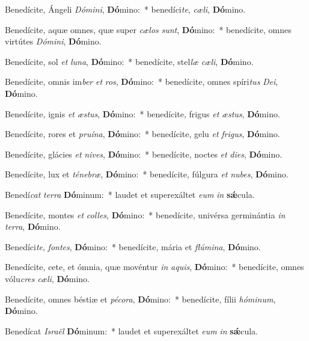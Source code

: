 \item Benedícite, Ángeli \textit{Dó}\textit{mi}\textit{ni}, \textbf{Dó}mino:~* benedíci\textit{te}, \textit{cæ}\textit{li}, \textbf{Dó}mino.
\item Benedícite, aquæ omnes, quæ super \textit{cæ}\textit{los} \textit{sunt}, \textbf{Dó}mino:~* benedícite, omnes virtútes \textit{Dó}\textit{mi}\textit{ni}, \textbf{Dó}mino.
\item Benedícite, sol \textit{et} \textit{lu}\textit{na}, \textbf{Dó}mino:~* benedícite, stel\textit{læ} \textit{cæ}\textit{li}, \textbf{Dó}mino.
\item Benedícite, omnis im\textit{ber} \textit{et} \textit{ros}, \textbf{Dó}mino:~* benedícite, omnes spíri\textit{tus} \textit{De}\textit{i}, \textbf{Dó}mino.
\item Benedícite, ignis \textit{et} \textit{æs}\textit{tus}, \textbf{Dó}mino:~* benedícite, frigus \textit{et} \textit{æs}\textit{tus}, \textbf{Dó}mino.
\item Benedícite, rores et \textit{pru}\textit{í}\textit{na}, \textbf{Dó}mino:~* benedícite, gelu \textit{et} \textit{fri}\textit{gus}, \textbf{Dó}mino.
\item Benedícite, glácies \textit{et} \textit{ni}\textit{ves}, \textbf{Dó}mino:~* benedícite, noctes \textit{et} \textit{di}\textit{es}, \textbf{Dó}mino.
\item Benedícite, lux et \textit{té}\textit{ne}\textit{bræ}, \textbf{Dó}mino:~* benedícite, fúlgura \textit{et} \textit{nu}\textit{bes}, \textbf{Dó}mino.
\item Benedí\textit{cat} \textit{ter}\textit{ra} \textbf{Dó}minum:~* laudet et superexáltet \textit{e}\textit{um} \textit{in} \textbf{sǽ}cula.
\item Benedícite, montes \textit{et} \textit{col}\textit{les}, \textbf{Dó}mino:~* benedícite, univérsa germinántia \textit{in} \textit{ter}\textit{ra}, \textbf{Dó}mino.
\item Benedíci\textit{te}, \textit{fon}\textit{tes}, \textbf{Dó}mino:~* benedícite, mária et \textit{flú}\textit{mi}\textit{na}, \textbf{Dó}mino.
\item Benedícite, cete, et ómnia, quæ movéntur \textit{in} \textit{a}\textit{quis}, \textbf{Dó}mino:~* benedícite, omnes vólu\textit{cres} \textit{cæ}\textit{li}, \textbf{Dó}mino.
\item Benedícite, omnes béstiæ et \textit{pé}\textit{co}\textit{ra}, \textbf{Dó}mino:~* benedícite, fílii \textit{hó}\textit{mi}\textit{num}, \textbf{Dó}mino.
\item Benedícat \textit{Is}\textit{ra}\textit{ël} \textbf{Dó}minum:~* laudet et superexáltet \textit{e}\textit{um} \textit{in} \textbf{sǽ}cula.
